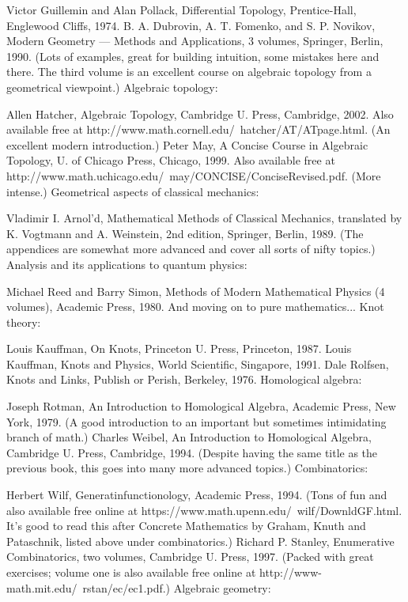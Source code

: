 \documentclass[10pt,a4paper]{book}
\theoremstyle{definition}
\begin{document}
Victor Guillemin and Alan Pollack, Differential Topology, Prentice-Hall, Englewood Cliffs, 1974.
B. A. Dubrovin, A. T. Fomenko, and S. P. Novikov, Modern Geometry — Methods and Applications, 3 volumes, Springer, Berlin, 1990. (Lots of examples, great for building intuition, some mistakes here and there. The third volume is an excellent course on algebraic topology from a geometrical viewpoint.)
Algebraic topology:

Allen Hatcher, Algebraic Topology, Cambridge U. Press, Cambridge, 2002. Also available free at http://www.math.cornell.edu/~hatcher/AT/ATpage.html. (An excellent modern introduction.)
Peter May, A Concise Course in Algebraic Topology, U. of Chicago Press, Chicago, 1999. Also available free at http://www.math.uchicago.edu/~may/CONCISE/ConciseRevised.pdf. (More intense.)
Geometrical aspects of classical mechanics:

Vladimir I. Arnol'd, Mathematical Methods of Classical Mechanics, translated by K. Vogtmann and A. Weinstein, 2nd edition, Springer, Berlin, 1989. (The appendices are somewhat more advanced and cover all sorts of nifty topics.)
Analysis and its applications to quantum physics:

Michael Reed and Barry Simon, Methods of Modern Mathematical Physics (4 volumes), Academic Press, 1980.
And moving on to pure mathematics...
Knot theory:

Louis Kauffman, On Knots, Princeton U. Press, Princeton, 1987.
Louis Kauffman, Knots and Physics, World Scientific, Singapore, 1991.
Dale Rolfsen, Knots and Links, Publish or Perish, Berkeley, 1976.
Homological algebra:

Joseph Rotman, An Introduction to Homological Algebra, Academic Press, New York, 1979. (A good introduction to an important but sometimes intimidating branch of math.)
Charles Weibel, An Introduction to Homological Algebra, Cambridge U. Press, Cambridge, 1994. (Despite having the same title as the previous book, this goes into many more advanced topics.)
Combinatorics:

Herbert Wilf, Generatinfunctionology, Academic Press, 1994. (Tons of fun and also available free online at https://www.math.upenn.edu/~wilf/DownldGF.html. It's good to read this after Concrete Mathematics by Graham, Knuth and Pataschnik, listed above under combinatorics.)
Richard P. Stanley, Enumerative Combinatorics, two volumes, Cambridge U. Press, 1997. (Packed with great exercises; volume one is also available free online at http://www-math.mit.edu/~rstan/ec/ec1.pdf.)
Algebraic geometry:
\end{document}
